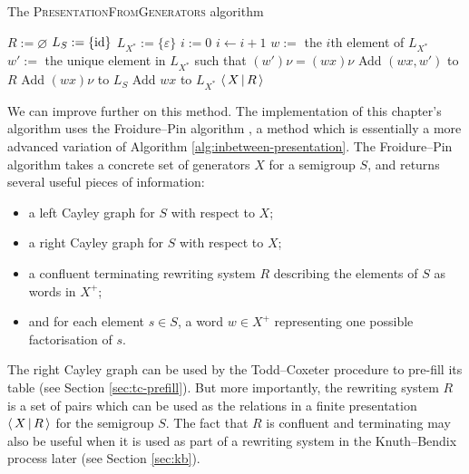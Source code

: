 \begin{algorithm}
\caption{The \textsc{PresentationFromGenerators} algorithm}
\label{alg:inbetween-presentation}
  \begin{algorithmic}[1]
      \State $R := \varnothing$
      \State $L_S := \{\operatorname{id}\}$
      \State $L_{X^*} := \{\varepsilon\}$
      \State $i := 0$  
      \Repeat
      \State $i \gets i + 1$
      \State $w :=$ the $i$th element of $L_{X^*}$
            
          \State $w' :=$ the unique element in $L_{X^*}$ such that $(w')\nu = (wx)\nu$
            \State Add $(wx, w')$ to $R$
          \Else  {}
            \State Add $(wx)\nu$ to $L_S$
            \State Add $wx$ to $L_{X^*}$
          \EndIf
        \EndFor
        
      \State \Return $\left\langle \, X \, \middle| \, R \, \right\rangle$
    \EndProcedure
  \end{algorithmic}
\end{algorithm}

We can improve further on this method.  The \libsemigroups{}
implementation of this chapter's algorithm uses the Froidure--Pin algorithm
\cite{froidure_pin}, a method which is essentially a more advanced variation of
Algorithm \ref{alg:inbetween-presentation}.  The Froidure--Pin algorithm takes a concrete set of
generators $X$ for a semigroup $S$, and returns several useful pieces
of information:
\begin{itemize}
\item a left Cayley graph for $S$ with respect to $X$;
\item a right Cayley graph for $S$ with respect to $X$;
\item a confluent terminating rewriting system $R$ describing the elements of
  $S$ as words in $X^+$;
\item and for each element $s \in S$, a word $w \in X^+$ representing one
  possible factorisation of $s$.
\end{itemize}
The right Cayley graph can be used by the Todd--Coxeter procedure to pre-fill its
table (see Section \ref{sec:tc-prefill}).  But more importantly, the rewriting
system $R$ is a set of pairs which can be used as the relations in a finite
presentation $\left\langle \, X \, \middle| \, R \, \right\rangle$ for the semigroup $S$.  The fact that $R$ is confluent
and terminating may also be useful when it is used as part of a rewriting system
in the Knuth--Bendix process later (see Section \ref{sec:kb}).

